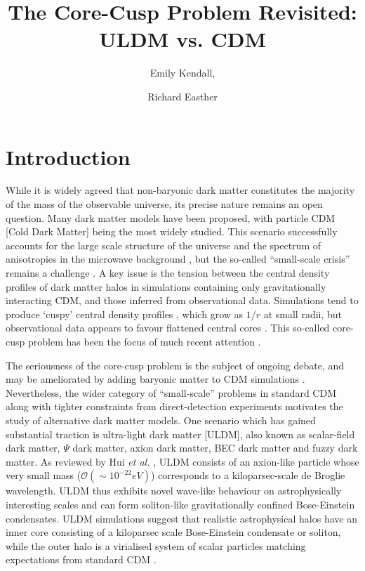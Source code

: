 \documentclass[a4paper,11pt]{article}
\title{\boldmath The Core-Cusp Problem Revisited: ULDM vs. CDM}
\author[1]{Emily Kendall,}
\author[1]{Richard Easther}
\affiliation[1]{Department of Physics, University of Auckland, Private Bag 92019, Auckland, New Zealand}
\begin{document}
\maketitle
\flushbottom


\section{Introduction}\label{sec:intro}

 
While it is widely agreed that non-baryonic dark matter constitutes the majority of the mass of the observable universe, its precise nature remains an open question. Many dark matter models have been proposed, with particle CDM [Cold Dark Matter]  being the most widely studied. This scenario successfully accounts for the large scale structure of the universe \cite{Springel:2005nw} and the spectrum of anisotropies in the microwave background \cite{deBernardis:2000sbo, Hanany:2000qf, Halverson:2001yy, Netterfield:2001yq, Lee:2001yp, Ade:2015xua,  Hu:2001bc}, but the so-called ``small-scale crisis''  remains a challenge \cite{Weinberg:2013aya}. A key issue is the tension between the  central density profiles of dark matter halos in simulations containing only gravitationally interacting CDM, and those inferred from observational data. Simulations tend to produce `cuspy' central density profiles \cite{Navarro:1995iw}, which grow as $1/r$ at small radii, but observational data appears to favour flattened central cores \cite{Moore:1994yx}. This so-called core-cusp problem has been the focus of much recent attention \cite{Dutton:2018nop, Read:2018pft, Genina:2018}. 
 
The seriousness of the core-cusp problem is the subject of ongoing debate, and may be ameliorated by adding baryonic matter to CDM simulations \cite{Benitez-Llambay:2018}. Nevertheless, the wider category of  ``small-scale'' problems in standard CDM along with tighter constraints from direct-detection experiments \cite{Schumann:2019eaa} motivates the study of alternative dark matter models. One scenario which has gained substantial traction is ultra-light dark matter [ULDM], also known as scalar-field dark matter, $\Psi$ dark matter, axion dark matter, BEC dark matter and fuzzy dark matter. As reviewed by Hui {\em et al.\/} \cite{Hui:2016ltb}, ULDM consists of an axion-like particle whose very small mass  ($\mathcal{O}(\sim 10^{-22}eV)$) corresponds to a kiloparsec-scale de Broglie wavelength. ULDM thus exhibits novel wave-like behaviour on astrophysically interesting scales and can form soliton-like gravitationally confined Bose-Einstein condensates. ULDM simulations suggest that realistic astrophysical halos have an inner core consisting of a kiloparsec scale Bose-Einstein condensate or soliton, while the outer halo is a virialised system of scalar particles matching expectations from standard CDM \cite{Schwabe:2016rze, Veltmaat:2018dfz}. 
\end{document}
